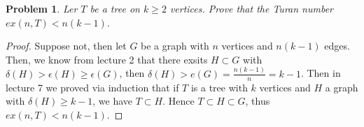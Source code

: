 \documentclass{article}
\newtheorem{prb}{Problem}
\begin{document}
\begin{prb}
	Ler $T$ be a tree on $k \geq 2$ vertices. Prove that the Turan number $ex(n, T) < n(k -1)$. 
\end{prb}

\begin{proof}
	Suppose not, then let $G$ be a graph with $n$ vertices and $n(k-1)$ edges. Then, we know from lecture 2 that there exsits 
	$H \subset G$ with $\delta(H) > \epsilon(H) \geq \epsilon(G)$, then 
	$\delta(H) > e(G) = \frac{n(k-1)}{n} = k -1$.  Then in lecture 7 we proved via induction that if $T$ is a tree with $k$ vertices 
	and $H$ a graph with $\delta(H) \geq k-1$, we have $T \subset H$. Hence $T \subset H \subset G$, thus $ex(n, T) < n(k-1)$. 
\end{proof}
\end{document}
